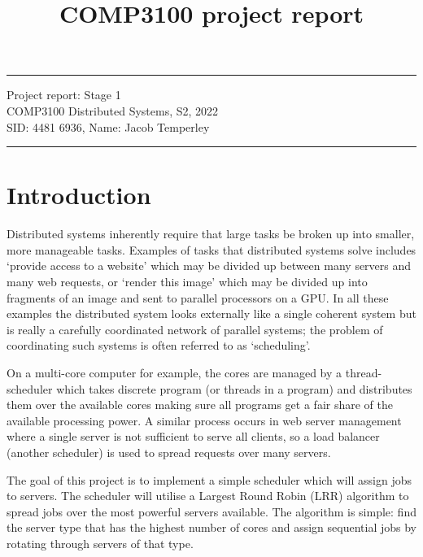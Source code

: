\documentclass[a4paper]{article} %
\begin{document}

\title{COMP3100 project report} %
\fancyhead[C]{}
\hrule \medskip %
\begin{minipage}{1\textwidth} %
\centering 
\large %
Project report: Stage 1\\ %
COMP3100 Distributed Systems, S2, 2022\\
\normalsize %
SID: 4481 6936, Name: Jacob Temperley
\end{minipage}
\medskip\hrule %
\bigskip

\section{Introduction}
Distributed systems inherently require that large tasks be broken up into smaller, more manageable tasks. Examples of tasks that distributed systems solve includes ‘provide access to a website’ which may be divided up between many servers and many web requests, or ‘render this image’ which may be divided up into fragments of an image and sent to parallel processors on a GPU. In all these examples the distributed system looks externally like a single coherent system but is really a carefully coordinated network of parallel systems; the problem of coordinating such systems is often referred to as ‘scheduling’.\par
On a multi-core computer for example, the cores are managed by a thread-scheduler which takes discrete program (or threads in a program) and distributes them over the available cores making sure all programs get a fair share of the available processing power. A similar process occurs in web server management where a single server is not sufficient to serve all clients, so a load balancer (another scheduler) is used to spread requests over many servers.\par
The goal of this project is to implement a simple scheduler which will assign jobs to servers. The scheduler will utilise a Largest Round Robin (LRR) algorithm to spread jobs over the most powerful servers available. The algorithm is simple: find the server type that has the highest number of cores and assign sequential jobs by rotating through servers of that type. 
\end{document}
